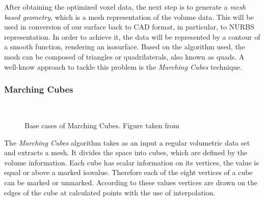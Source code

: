 After obtaining the optimized voxel data, the next step is to generate a \emph{mesh based
geometry}, which is a mesh representation of the volume data.  
This will be used in conversion of our surface back to CAD format, in particular, to NURBS representation. In order to achieve it, the
data will be represented by a contour of a smooth function, rendering an isosurface. Based on the algorithm used, the mesh can be composed of triangles or quadrilaterals, also known as quads. A well-know approach to tackle this problem is the \emph{Marching Cubes} technique.


\subsubsection{Marching Cubes} 
\begin{figure}
\centering
   \\
   \caption{Base cases of Marching Cubes. Figure taken from \cite{Marching2006} }
   \label{fig:MC_basecase}
\end{figure}
The \emph{Marching Cubes} algorithm \cite{Marching2006} takes as an input a regular volumetric data set and extracts a mesh. It
divides the space into cubes, which are defined by the volume information. Each cube has scalar
information on its vertices, the value is equal or above a marked isovalue. Therefore each of the
eight vertices of a cube can be marked or unmarked. According to these values vertices are drawn
on the edges of the cube at calculated points with the use of interpolation. 

